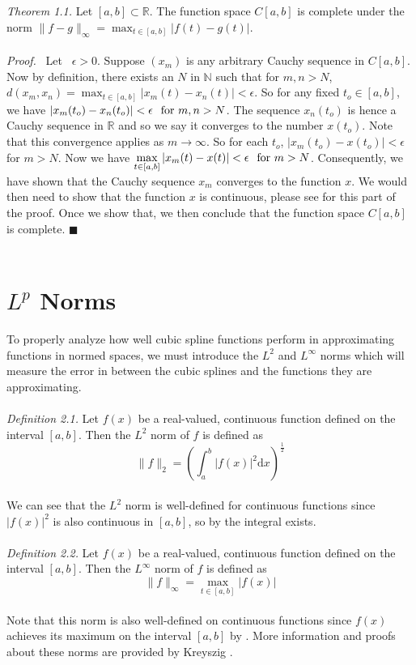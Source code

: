 \\\\
\emph{Theorem 1.1.} Let $[a,b] \subset \mathbb{R}.$ The function space $C[a,b]$ is complete under the norm $\displaystyle{\|f-g\|_{\infty}=\max_{t \in [a,b]} |f(t)-g(t)|}$.
\\\\
\emph{Proof.} \ Let \ $\epsilon > 0$. Suppose $(x_{m})$ is any arbitrary Cauchy sequence in $C[a,b]$. Now by definition, there exists an $N$ in $\mathbb{N}$ such that for $m,n > N$,\\
$\displaystyle{d(x_{m},x_{n})= \max_{t \in [a,b]} |x_{m}(t)-x_{n}(t)| < \epsilon}$. So for any fixed $t_o \in [a,b]$, we have
$|x_{m}(t_o)-x_{n}(t_o)| < \epsilon \hspace{0.25cm} \text{for} \ m,n > N$.
The sequence ${x_n(t_o)}$ is hence a Cauchy sequence in $\mathbb{R}$ and so we say it converges to the number $x(t_o)$. Note that this convergence applies as $m \rightarrow \infty$. So for each $t_o$, $|x_m(t_o)-x(t_o)| < \epsilon$ for $m > N$. Now we have
$\displaystyle{\max_{t \in [a,b]} |x_{m}(t)-x(t)| < \epsilon} \hspace{0.25cm} \text{for} \ m > N$.
Consequently, we have shown that the Cauchy sequence ${x_m}$ converges to the function $x$. We would then need to show that the function $x$ is continuous, please see \cite{key4} for this part of the proof. Once we show that, we then conclude that the function space $C[a,b]$ is complete. $\blacksquare$\\\\
\section{$L^p$ Norms}
To properly analyze how well cubic spline functions perform in approximating functions in normed spaces, we must introduce the $L^2$ and $L^{\infty}$ norms which will measure the error in between the cubic splines and the functions they are approximating.\\\\
\emph{Definition 2.1.} Let $f(x)$ be a real-valued, continuous function defined on the interval $[a,b]$. Then the $L^2$ norm of $f$ is defined as \newline
\\
\[\|f\|_2 = \left(\int_{a}^{b}|f(x)|^2\mathrm{d}x\right)^{\frac{1}{2}}\]\newline
\\
We can see that the $L^2$ norm is well-defined for continuous functions since $|f(x)|^2$ is also continuous in $[a,b]$, so by \cite[pg.~155]{key7} the integral exists.\\\\
\emph{Definition 2.2.} Let $f(x)$ be a real-valued, continuous function defined on the interval $[a,b]$. Then the $L^{\infty}$ norm of $f$ is defined as \newline\\
\[\|f\|_{\infty} = \max_{t \in [a,b]} |f(x)|\]\\
Note that this norm is also well-defined on continuous functions since $f(x)$ achieves its maximum on the interval $[a,b]$ by \cite[pg.~106]{key7}. More information and proofs about these norms are provided by Kreyszig \cite[pg.~61]{key4}.